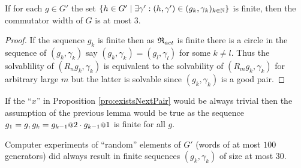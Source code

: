 \documentclass[a4paper,12pt]{article}
\begin{document}
 \begin{cor} \label{cor:finiteCyclesimpliesCommutatorWidth3}
  If for each $g\in G'$ the set $\{h\in G'\mid \exists \gamma': (h,\gamma') \in (g_k,\gamma_k)_{k\in\mathbb{N}}\}$ is finite, then the commutator width of $G$ is at most $3$.
 \end{cor}
 \begin{proof}
  If the sequence $g_k$ is finite then as $\mathfrak{R}_{act}$ is finite there is a circle in the sequence of $(g_k,\gamma_k)$ 
   say $(g_k,\gamma_k) = (g_l,\gamma_l)$ for some $k\neq l$. Thus the solvablility of $(R_ng_k,\gamma_k)$ is equivalent to the solvability of
   $(R_mg_k,\gamma_k)$ for arbitrary large $m$ but the latter is solvable since $(g_k,\gamma_k)$ is a good pair.
 \end{proof}
 \begin{re}
  If the ``$x$'' in Proposition \ref{pro:existsNextPair} would be always trivial then the assumption of the previous lemma would be true as the sequence
  $g_1 = g, g_k=g_{k-1}\at{2} \cdot g_{k-1}\at{1}$ is finite for all $g$.
 \end{re}

 \begin{re}
  Computer experiments of ``random'' elements of $G'$ (words of at most $100$ generators) did always result in finite sequences $(g_k,\gamma_k)$ of size at most $30$.
 \end{re}
\end{document}
